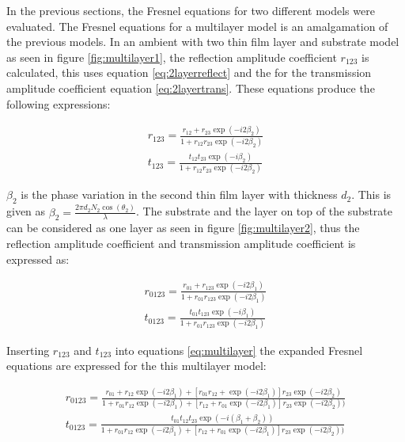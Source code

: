 \documentclass[MasterThesisMain.tex]{subfiles}
\begin{document}
In the previous sections, the Fresnel equations for two different models were evaluated. The Fresnel equations for a multilayer model is an amalgamation of the previous models. In an ambient with two thin film layer and substrate model as seen in figure \ref{fig:multilayer1}, the reflection amplitude coefficient $r_{123}$ is calculated, this uses equation \ref{eq:2layerreflect} and the for the transmission amplitude coefficient equation \ref{eq:2layertrans}. These equations produce the following expressions:

\begin{align}
r_{123}= \frac{r_{12}+r_{23}\exp(-i2\beta_2)}{1+r_{12}r_{23}\exp(-i2\beta_2)}\\
t_{123}=\frac{t_{12}t_{23}\exp(-i\beta_2)}{1+r_{12}r_{23}\exp(-i2\beta_2)}
\end{align}

$\beta_2$ is the phase variation in the second thin film layer with thickness $d_2$. This is given as $\beta_2=\frac{2\pi d_2N_2\cos(\theta_2)}{\lambda}$. The substrate and the layer on top of the substrate can be considered as one layer as seen in figure \ref{fig:multilayer2}, thus the reflection amplitude coefficient and transmission amplitude coefficient is expressed as:         

\begin{align}\label{eq:multilayer}
r_{0123}= \frac{r_{01}+r_{123}\exp(-i2\beta_1)}{1+r_{01}r_{123}\exp(-i2\beta_1)}\\
t_{0123}=\frac{t_{01}t_{123}\exp(-i\beta_1)}{1+r_{01}r_{123}\exp(-i2\beta_1)}
\end{align}

Inserting $r_{123}$ and $t_{123}$ into equations \ref{eq:multilayer} the expanded Fresnel equations are expressed for the this multilayer model:

\begin{align}
r_{0123} = \frac{r_{01}+r_{12}\exp(-i2\beta_1)+[r_{01}r_{12}+\exp(-i2\beta_1)]r_{23}\exp(-i2\beta_2)}{1+r_{01}r_{12}\exp(-i2\beta_1)+[r_{12}+r_{01}\exp(-i2\beta_1)]r_{23}\exp(-i2\beta_2))}\\
t_{0123} = \frac{t_{01}t_{12}t_{23}\exp(-i(\beta_1+\beta_2))}{1+r_{01}r_{12}\exp(-i2\beta_1)+[r_{12}+r_{01}\exp(-i2\beta_1)]r_{23}\exp(-i2\beta_2))}
\end{align}
\end{document}
